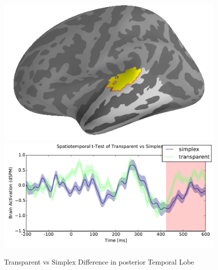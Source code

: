 \documentclass{frontiersSCNS}
\begin{document}
\begin{figure}
\begin{centering}
\includegraphics[scale=0.50]{images/transparent_2_prime_brain_analysis}\includegraphics[scale=0.50]{images/transparent_2_prime_analysis}
\par\end{centering}
\caption{\label{fig:transparent_2_primes} Transparent vs Simplex Difference in posterior Temporal Lobe}
\end{figure}
\end{document}
